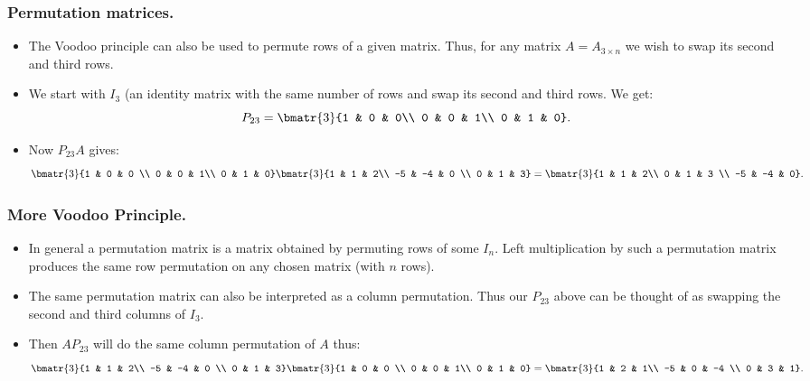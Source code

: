 \begin{frame}%
  \frametitle{Permutation matrices.}
  \begin{itemize}%
 
\item The Voodoo principle can also be used to permute rows of a given
matrix. Thus, for any matrix $A=A_{3\times n}$  we wish to swap its
second and third rows.

\item We start with $I_3$ (an identity  matrix with the same number of
rows and swap its second and third rows.
We get:
$$P_{23} = \bmatr{3}{1 & 0 & 0\\
                    0 & 0 & 1\\
                    0 & 1 & 0}.$$
\item Now $P_{23}A$ gives:
$$\bmatr{3}{1 & 0 & 0 \\
          0 & 0 & 1\\
          0 & 1 & 0}
\bmatr{3}{1 & 1 & 2\\
          -5 & -4 & 0 \\
           0 & 1 & 3} =
\bmatr{3}{1 & 1 & 2\\
          0 & 1 & 3 \\
          -5 & -4 & 0}.$$
\end{itemize}
\end{frame}
\begin{frame}%
  \frametitle{More Voodoo Principle.}
  \begin{itemize}%
 
\item In general a permutation matrix is a matrix obtained by permuting
rows of some $I_n$. Left multiplication by such a permutation matrix
produces the
same row permutation on any chosen matrix (with $n$ rows).

\item The same permutation matrix can also be interpreted as a column
permutation. Thus our $P_{23}$ above can be thought of as swapping the
second and third columns of $I_3$.

\item Then $AP_{23}$ will do the same column permutation of $A$ thus:
$$\bmatr{3}{1 & 1 & 2\\
          -5 & -4 & 0 \\
           0 & 1 & 3}
\bmatr{3}{1 & 0 & 0 \\
          0 & 0 & 1\\
          0 & 1 & 0}
 =
\bmatr{3}{1 & 2 & 1\\
          -5 & 0 & -4 \\
          0 & 3 & 1}.$$

\end{itemize}
\end{frame}

